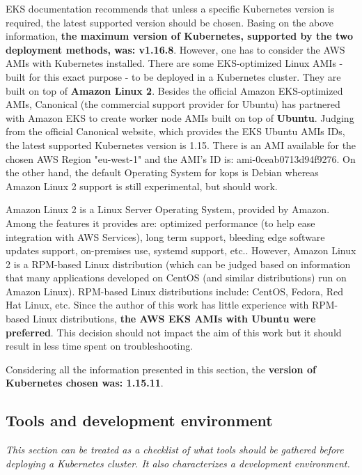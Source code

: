 EKS documentation recommends that unless a specific Kubernetes version is required, the latest supported version should be chosen\cite{online-eks-versions}. Basing on the above information, \textbf{the maximum version of Kubernetes, supported by the two deployment methods, was: v1.16.8}. However, one has to consider the AWS AMIs with Kubernetes installed. There are some EKS-optimized Linux AMIs - built for this exact purpose - to be deployed in a Kubernetes cluster. They are built on top of \textbf{Amazon Linux 2}\cite{eks-optimized-ami}. Besides the official Amazon EKS-optimized AMIs, Canonical (the commercial support provider for Ubuntu) has partnered with Amazon EKS to create worker node AMIs built on top of \textbf{Ubuntu}\cite{eks-ubu}. Judging from the official Canonical website, which provides the EKS Ubuntu AMIs IDs, the latest supported Kubernetes version is 1.15. There is an AMI available for the chosen AWS Region "eu-west-1" and the AMI's ID is: ami-0ceab0713d94f9276\cite{eks-ubu-ami-id}. On the other hand, the default Operating System for kops is Debian whereas Amazon Linux 2 support is still experimental, but should work\cite{online-kops-img}.

Amazon Linux 2 is a Linux Server Operating System, provided by Amazon. Among the features it provides are: optimized performance (to help ease integration with AWS Services), long term support, bleeding edge software updates support, on-premises use, systemd support, etc.\cite{al2}. However, Amazon Linux 2 is a RPM-based Linux distribution (which can be judged based on information that many applications developed on CentOS (and similar distributions) run on Amazon Linux)\cite{al2-centos}. RPM-based Linux distributions include: CentOS, Fedora, Red Hat Linux, etc. Since the author of this work has little experience with RPM-based Linux distributions, \textbf{the AWS EKS AMIs with Ubuntu were preferred}. This decision should not impact the aim of this work but it should result in less time spent on troubleshooting.

Considering all the information presented in this section, the \textbf{version of Kubernetes chosen was: 1.15.11}.



\subsection{Tools and development environment}
\label{tools}
\textit{This section can be treated as a checklist of what tools should be gathered before deploying a Kubernetes cluster. It also characterizes a development environment.}
\\

